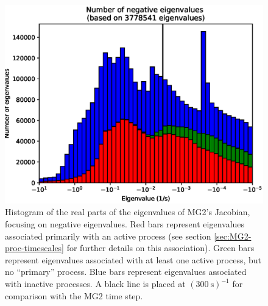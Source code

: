 \documentclass [11pt, proquest] {uwthesis}[2020/02/24]
\begin{document}
\begin{figure}[!htbp]
  \includegraphics[width=6.5in]{./time_hist_all_values_neg.eps}
  \caption[Histogram of the negative eigenvalues of the Jacobian of MG2]{Histogram of the real parts of the eigenvalues of MG2's Jacobian, focusing on negative eigenvalues. Red bars represent eigenvalues associated primarily with an active process (see section \ref{sec:MG2-proc-timescales} for further details on this association). Green bars represent eigenvalues associated with at least one active process, but no ``primary'' process. Blue bars represent eigenvalues associated with inactive processes. A black line is placed at $(\SI{300}{\second})^{-1}$ for comparison with the MG2 time step.}
  \label{neg-eig-hist}
\end{figure}
\end{document}
